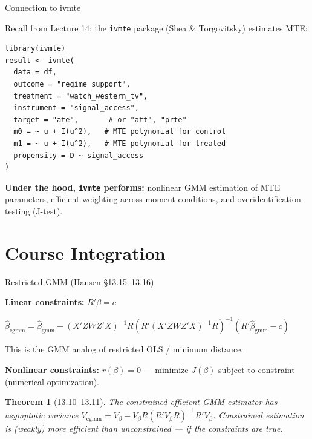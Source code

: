 \documentclass[aspectratio=169, handout]{beamer}
\newtheorem{thm}{Theorem}
\numberwithin{equation}{section}
\begin{document}
\begin{frame}[fragile]{Connection to ivmte}

Recall from Lecture 14: the \texttt{ivmte} package (Shea \& Torgovitsky) estimates MTE:

\begin{lstlisting}[basicstyle=\ttfamily\footnotesize]
library(ivmte)
result <- ivmte(
  data = df,
  outcome = "regime_support",
  treatment = "watch_western_tv",
  instrument = "signal_access",
  target = "ate",       # or "att", "prte"
  m0 = ~ u + I(u^2),   # MTE polynomial for control
  m1 = ~ u + I(u^2),   # MTE polynomial for treated
  propensity = D ~ signal_access
)
\end{lstlisting}

\smallskip
\textbf{Under the hood, \texttt{ivmte} performs:} nonlinear GMM estimation of MTE parameters, efficient weighting across moment conditions, and overidentification testing (J-test).

\end{frame}

\section{Course Integration}

\begin{frame}{Restricted GMM (Hansen \S13.15--13.16)}

\textbf{Linear constraints:} $R'\beta = c$

\smallskip
$\hat\beta_{\text{cgmm}} = \hat\beta_{\text{gmm}} - (X'ZWZ'X)^{-1}R\!\left(R'(X'ZWZ'X)^{-1}R\right)^{-1}\!(R'\hat\beta_{\text{gmm}} - c)$

\smallskip
This is the GMM analog of restricted OLS / minimum distance.

\medskip
\textbf{Nonlinear constraints:} $r(\beta) = 0$ --- minimize $J(\beta)$ subject to constraint (numerical optimization).

\medskip
\begin{thm}[13.10--13.11]
The constrained efficient GMM estimator has asymptotic variance
$V_{\text{cgmm}} = V_\beta - V_\beta R(R'V_\beta R)^{-1}R'V_\beta$.
Constrained estimation is (weakly) more efficient than unconstrained --- if the constraints are true.
\end{thm}

\end{frame}
\end{document}
